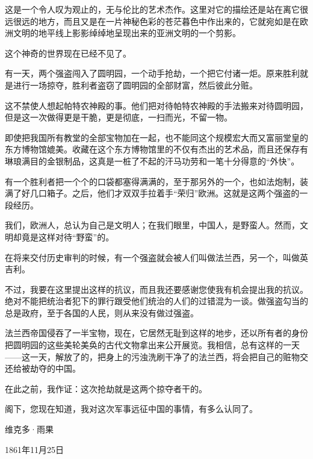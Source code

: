 \documentclass[12pt,UTF-8,openany]{ctexbook}
\begin{document}
\begin{normalsize}
    这是一个令人叹为观止的，无与伦比的艺术杰作。这里对它的描绘还是站在离它很远很远的地方，而且又是在一片神秘色彩的苍茫暮色中作出来的，它就宛如是在欧洲文明的地平线上影影绰绰地呈现出来的亚洲文明的一个剪影。
    
    这个神奇的世界现在已经不见了。
    
    有一天，两个强盗闯入了圆明园，一个动手抢劫，一个把它付诸一炬。原来胜利就是进行一场掠夺，胜利者盗窃了圆明园的全部财富，然后彼此分赃。
    
    这不禁使人想起帕特农神殿的事。他们把对待帕特农神殿的手法搬来对待圆明园，但是这一次做得更是干脆，更是彻底，一扫而光，不留一物。
    
    即使把我国所有教堂的全部宝物加在一起，也不能同这个规模宏大而又富丽堂皇的东方博物馆媲美。收藏在这个东方博物馆里的不仅有杰出的艺术品，而且还保存有琳琅满目的金银制品，这真是一桩了不起的汗马功劳和一笔十分得意的“外快”。
    
    有一个胜利者把一个个的口袋都塞得满满的，至于那另外的一个，也如法炮制，装满了好几口箱子。之后，他们才双双手拉着手“荣归”欧洲。这就是这两个强盗的一段经历。
    
    我们，欧洲人，总认为自己是文明人；在我们眼里，中国人，是野蛮人。然而，文明却竟是这样对待“野蛮”的。
    
    在将来交付历史审判的时候，有一个强盗就会被人们叫做法兰西，另一个，叫做英吉利。
    
    不过，我要在这里提出这样的抗议，而且我还要感谢您使我有机会提出我的抗议。绝对不能把统治者犯下的罪行跟受他们统治的人们的过错混为一谈。做强盗勾当的总是政府，至于各国的人民，则从来没有做过强盗。
    
    法兰西帝国侵吞了一半宝物，现在，它居然无耻到这样的地步，还以所有者的身份把圆明园的这些美轮美奂的古代文物拿出来公开展览。我相信，总有这样的一天——这一天，解放了的，把身上的污浊洗刷干净了的法兰西，将会把自己的赃物交还给被劫夺的中国。
    
    在此之前，我作证：这次抢劫就是这两个掠夺者干的。
    
    阁下，您现在知道，我对这次军事远征中国的事情，有多么认同了。
    
    \vspace{36pt}
    
    \begin{flushright}
        维克多·雨果
        
        1861年11月25日
        
    \end{flushright}
    
    
    
\end{normalsize}
\end{document}
